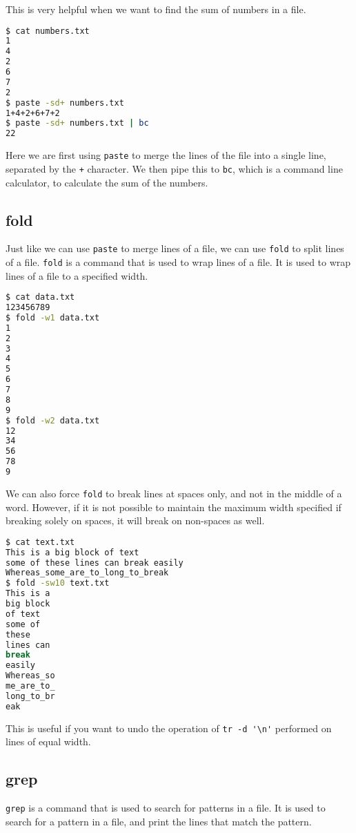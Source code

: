 This is very helpful when we want to find the sum of numbers in a file.

\begin{lstlisting}[language=bash]
$ cat numbers.txt
1
4
2
6
7
2
$ paste -sd+ numbers.txt
1+4+2+6+7+2
$ paste -sd+ numbers.txt | bc
22
\end{lstlisting}

Here we are first using \lstinline|paste| to merge the lines of the file into a single line, separated by the \lstinline|+| character. We then pipe this to \lstinline|bc|, which is a command line calculator, to calculate the sum of the numbers.

\subsection{fold}

Just like we can use \lstinline|paste| to merge lines of a file, we can use \lstinline|fold| to split lines of a file. \lstinline|fold| is a command that is used to wrap lines of a file. It is used to wrap lines of a file to a specified width.

\begin{lstlisting}[language=bash]
$ cat data.txt
123456789
$ fold -w1 data.txt
1
2
3
4
5
6
7
8
9
$ fold -w2 data.txt
12
34
56
78
9
\end{lstlisting}

We can also force \lstinline|fold| to break lines at spaces only, and not in the middle of a word. However, if it is not possible to maintain the maximum width specified if breaking solely on spaces, it will break on non-spaces as well.

\begin{lstlisting}[language=bash]
$ cat text.txt
This is a big block of text
some of these lines can break easily
Whereas_some_are_to_long_to_break
$ fold -sw10 text.txt
This is a
big block
of text
some of
these
lines can
break
easily
Whereas_so
me_are_to_
long_to_br
eak
\end{lstlisting}

This is useful if you want to undo the operation of \lstinline|tr -d '\n'| performed on lines of equal width.

\subsection{grep}

\lstinline|grep| is a command that is used to search for patterns in a file. It is used to search for a pattern in a file, and print the lines that match the pattern.

